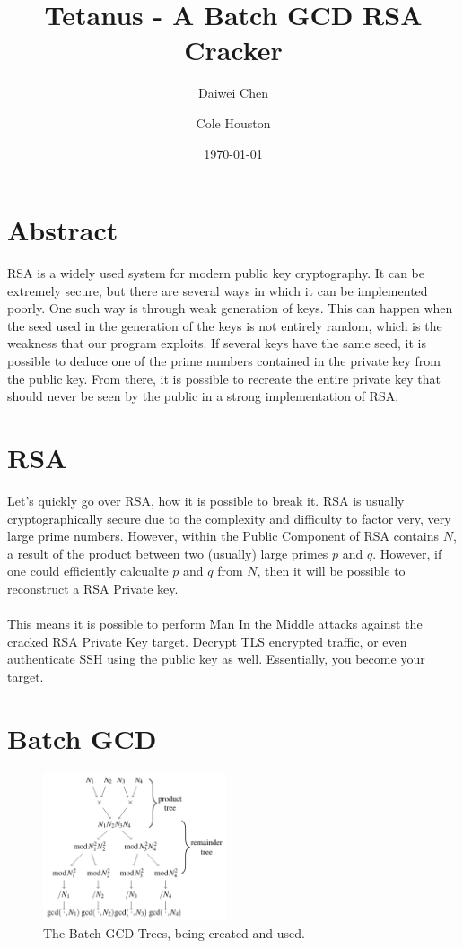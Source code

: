 \documentclass[10pt, letterpaper]{article}
\title{Tetanus - A Batch GCD RSA Cracker}
\author{Daiwei Chen \and Cole Houston}
\date{\today}
\begin{document}
\maketitle

\section{Abstract}
RSA is a widely used system for modern public key cryptography. It can be extremely secure, but there are several ways in which it can be implemented poorly. One such way is through weak generation of keys. This can happen when the seed used in the generation of the keys is not entirely random, which is the weakness that our program exploits. If several keys have the same seed, it is possible to deduce one of the prime numbers contained in the private key from the public key.  From there, it is possible to recreate the entire private key that should never be seen by the public in a strong implementation of RSA.

\section{RSA}
Let's quickly go over RSA, how it is possible to break it. RSA is usually cryptographically secure due to the complexity and difficulty to factor very, very large prime numbers. However, within the Public Component of RSA contains $N$, a result of the product between two (usually) large primes $p$ and $q$. However, if one could efficiently calcualte $p$ and $q$ from $N$, then it will be possible to reconstruct a RSA Private key. \\
\\
This means it is possible to perform Man In the Middle attacks against the cracked RSA Private Key target. Decrypt TLS encrypted traffic, or even authenticate SSH using the public key as well. Essentially, you become your target.

\section{Batch GCD}

\begin{figure}
  \begin{center}
    \includegraphics[width=0.48\textwidth]{batch-gcd-tree.png}
  \end{center}
  \caption{The Batch GCD Trees, being created and used.}
\end{figure}
\end{document}
